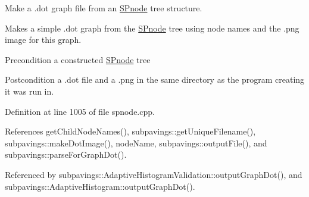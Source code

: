 \-Make a .dot graph file from an \hyperlink{classsubpavings_1_1SPnode}{\-S\-Pnode} tree structure. 

\-Makes a simple .dot graph from the \hyperlink{classsubpavings_1_1SPnode}{\-S\-Pnode} tree using node names and the .png image for this graph.

\begin{DoxyPrecond}{\-Precondition}
a constructed \hyperlink{classsubpavings_1_1SPnode}{\-S\-Pnode} tree 
\end{DoxyPrecond}
\begin{DoxyPostcond}{\-Postcondition}
a .dot file and a .png in the same directory as the program creating it was run in. 
\end{DoxyPostcond}


\-Definition at line 1005 of file spnode.\-cpp.



\-References get\-Child\-Node\-Names(), subpavings\-::get\-Unique\-Filename(), subpavings\-::make\-Dot\-Image(), node\-Name, subpavings\-::output\-File(), and subpavings\-::parse\-For\-Graph\-Dot().



\-Referenced by subpavings\-::\-Adaptive\-Histogram\-Validation\-::output\-Graph\-Dot(), and subpavings\-::\-Adaptive\-Histogram\-::output\-Graph\-Dot().


